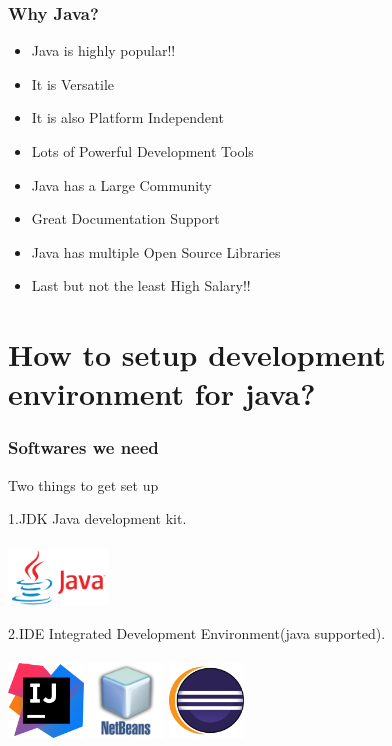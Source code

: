 \documentclass{beamer}
\begin{document}
\begin{frame}
\frametitle{Why Java?}
\begin{itemize}
\item Java is highly popular!!
\item It is Versatile
\item It is also Platform Independent
\item Lots of Powerful Development Tools
\item Java has a Large Community
\item Great Documentation Support
\item Java has multiple Open Source Libraries
\item Last but not the least High Salary!!

\end{itemize}
\end{frame}

\section{How to setup development environment for java?}

\begin{frame}
\frametitle{Softwares we need}
\vspace{0.2in}
\centerline{\huge{Two things to get set up}}
\vspace{0.2in}
\begin{block}{1.JDK}
Java development kit.\\~\\
\includegraphics[width=0.2\textwidth]{jdk.png}
\end{block}
\begin{block}{2.IDE}
Integrated Development Environment(java supported).\\~\\
\includegraphics[width=0.15\textwidth]{ide1.png} \vspace{1cm}   \includegraphics[width=0.15\textwidth]{ide2.png} \vspace{1 		cm}  \includegraphics[width=0.15\textwidth]{ide3.png}
\end{block}
\end{frame}
\end{document}

